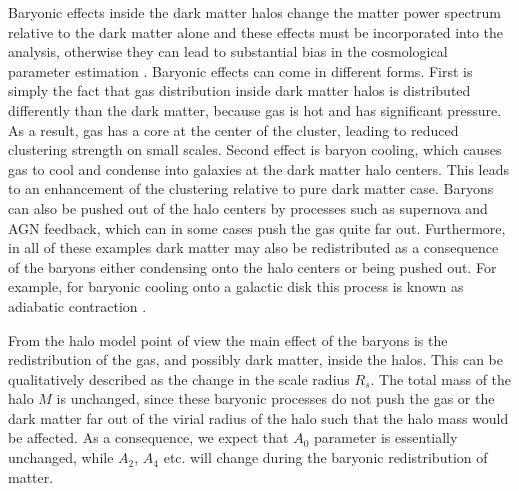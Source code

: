 \documentclass[
  11pt,
  twoside,
  openright,
  titlepage,
  headings=optiontoheadandtoc
]{scrbook}
\begin{document}
\clearpage


Baryonic effects inside the dark matter halos change the matter power spectrum relative to the dark matter 
alone and these effects must be incorporated into the analysis, otherwise they can lead to substantial bias 
in the cosmological parameter estimation \citep{2011MNRAS.417.2020S,2013MNRAS.434..148S}. 
Baryonic effects can come in different forms. First is 
simply the fact that gas distribution inside dark matter halos is distributed differently than the dark matter, 
because gas is hot and has significant pressure. As a result, gas has a core at the center of the cluster, leading 
to reduced clustering strength on small scales. Second effect is baryon cooling, which causes gas to cool and 
condense into galaxies at the dark matter halo centers. This leads to an enhancement of the clustering relative 
to pure dark matter case. Baryons can also be pushed out of the halo centers by processes such as 
supernova and AGN feedback, which can in some cases push the gas quite far out. Furthermore, in all of these
examples dark matter may also be redistributed as a consequence of the baryons either condensing onto the 
halo centers or being pushed out. For example, 
for baryonic cooling onto a galactic disk this process is known as adiabatic contraction \citep{1984Natur.311..517B}.  

From the halo model point of view the main effect of the baryons is the redistribution of the gas, and possibly 
dark matter, inside the halos. This can be qualitatively described as the change in the 
scale radius $R_s$. The total mass of the halo $M$ is unchanged, since these baryonic processes do not push the 
gas or the dark matter far out of the virial radius of the halo such that the halo mass would be affected. 
As a consequence, we expect that $A_0$ parameter is essentially unchanged, while $A_2$, $A_4$ etc. will change 
during the baryonic redistribution of matter. 
\end{document}
